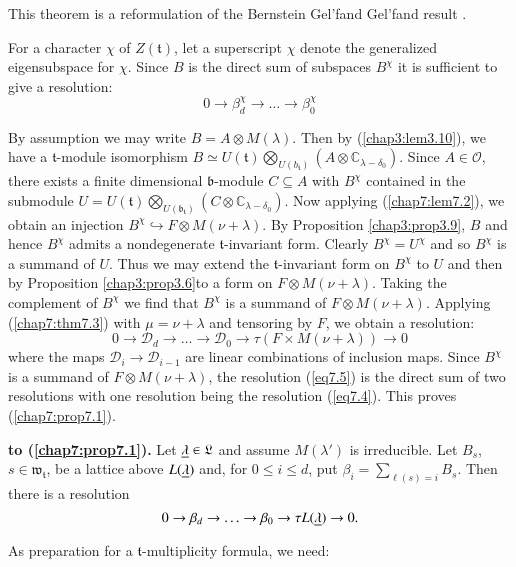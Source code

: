 This theorem is a reformulation of the Bernstein Gel'fand Gel'fand
result \cite{key1}. 

For a character $\chi$ of $Z(\mathfrak{t})$, let a superscript $\chi$
denote the generalized eigensubspace for $\chi$. Since $B$ is the
direct sum of subspaces $B^\chi$ it is sufficient to give a
resolution:
\begin{equation*}
0 \to \beta^{\chi}_d \to \ldots \to \beta^{\chi}_0
\tag{7.4}\label{eq7.4}
\end{equation*}

By assumption we may write $B = A \otimes M(\lambda)$. Then by
(\ref{chap3:lem3.10}), we have a $\mathfrak{t}$-module isomorphism $B \simeq
U(\mathfrak{t}) \bigotimes\limits_{U(b_\mathfrak{t})} (A \otimes
\mathbb{C}_{\lambda - \delta_0})$. Since $A \in \mathscr{O}$, there
exists a finite dimensional $\mathfrak{b}$-module $C \subseteq A$ with
$B^\chi$ contained in the submodule $U = U(\mathfrak{t})
\bigotimes\limits_{U(\mathfrak{b}_\mathfrak{t})} (C \otimes
\mathbb{C}_{\lambda - \delta_0})$. Now applying (\ref{chap7:lem7.2}), we obtain an
injection $B^\chi \hookrightarrow F \otimes M (\nu + \lambda)$. By
Proposition \ref{chap3:prop3.9}, $B$ and hence $B^\chi$ admits a nondegenerate
$\mathfrak{t}$-invariant form. Clearly $B^\chi = U^\chi$ and so
$B^\chi$ is a summand of $U$. Thus we may extend the
$\mathfrak{t}$-invariant form on $B^\chi$ to $U$ and then by
Proposition \ref{chap3:prop3.6}\pageoriginale to a form on $F \otimes M(\nu +
\lambda)$. Taking the complement of $B^\chi$ we find that $B^\chi$ is
a summand of $F \otimes M(\nu+ \lambda)$. Applying (\ref{chap7:thm7.3}) with $\mu =
\nu + \lambda$ and tensoring by $F$, we obtain a resolution:
\begin{equation*}
0 \to \mathscr{D}_d \to \ldots \to \mathscr{D}_0 \to \tau (F \times
M(\nu + \lambda)) \to 0 \tag{7.5}\label{eq7.5}
\end{equation*}
where the maps $\mathscr{D}_i \to \mathscr{D}_{i-1}$ are linear
combinations of inclusion maps. Since $B^\chi$ is a summand of $F
\otimes M(\nu + \lambda)$, the resolution (\ref{eq7.5}) is the direct sum of
two resolutions with one resolution being the resolution (\ref{eq7.4}). This
proves (\ref{chap7:prop7.1}). 

\setcounter{prop}{5}
\begin{coro}\label{chap7:coro7.6}
{\bf to (\ref{chap7:prop7.1}).} Let $\underline{\lambda} \in \mathfrak{L}$ and assume
$M(\lambda')$ is irreducible. Let $B_s$, $s \in
\mathfrak{w}_\mathfrak{t}$, be a lattice above $L(\underline{\lambda})$ and,
for $0 \leq i \leq d$, put $\beta_i = \sum\limits_{\ell(s) = i }
B_s$. Then there is a resolution 
$$
0 \to \beta_d \to \ldots \to \beta_0 \to \tau L(\underline{\lambda}) \to 0.
$$

As preparation for a $\mathfrak{t}$-multiplicity formula, we need:
\end{coro}

